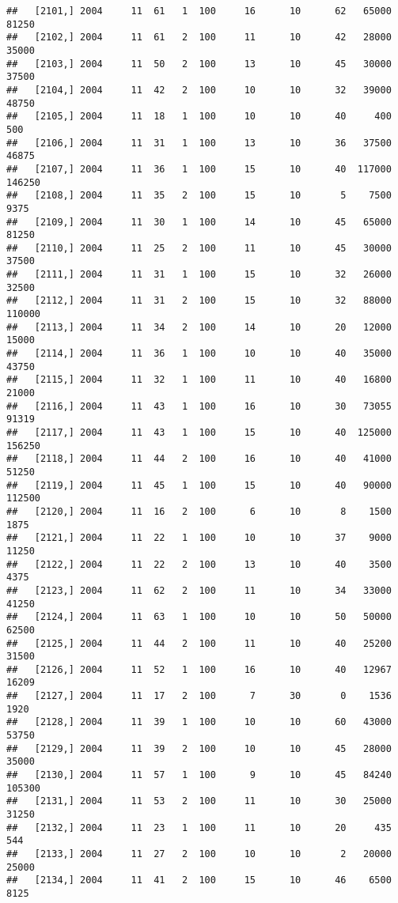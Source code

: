 \documentclass{article}\usepackage[]{graphicx}\usepackage[]{color}
\makeatletter
\newenvironment{kframe}{%
 \def\at@end@of@kframe{}%
 \ifinner\ifhmode%
  \def\at@end@of@kframe{\end{minipage}}%
  \begin{minipage}{\columnwidth}%
 \fi\fi%
 \def\FrameCommand##1{\hskip\@totalleftmargin \hskip-\fboxsep
 \colorbox{shadecolor}{##1}\hskip-\fboxsep
     \hskip-\linewidth \hskip-\@totalleftmargin \hskip\columnwidth}%
 \MakeFramed {\advance\hsize-\width
   \@totalleftmargin\z@ \linewidth\hsize
   \@setminipage}}%
 {\par\unskip\endMakeFramed%
 \at@end@of@kframe}
\newenvironment{knitrout}{}{} %
\makeatother
\begin{document}
\begin{knitrout}
\begin{kframe}
\begin{verbatim}
##   [2101,] 2004     11  61   1  100     16      10      62   65000   81250
##   [2102,] 2004     11  61   2  100     11      10      42   28000   35000
##   [2103,] 2004     11  50   2  100     13      10      45   30000   37500
##   [2104,] 2004     11  42   2  100     10      10      32   39000   48750
##   [2105,] 2004     11  18   1  100     10      10      40     400     500
##   [2106,] 2004     11  31   1  100     13      10      36   37500   46875
##   [2107,] 2004     11  36   1  100     15      10      40  117000  146250
##   [2108,] 2004     11  35   2  100     15      10       5    7500    9375
##   [2109,] 2004     11  30   1  100     14      10      45   65000   81250
##   [2110,] 2004     11  25   2  100     11      10      45   30000   37500
##   [2111,] 2004     11  31   1  100     15      10      32   26000   32500
##   [2112,] 2004     11  31   2  100     15      10      32   88000  110000
##   [2113,] 2004     11  34   2  100     14      10      20   12000   15000
##   [2114,] 2004     11  36   1  100     10      10      40   35000   43750
##   [2115,] 2004     11  32   1  100     11      10      40   16800   21000
##   [2116,] 2004     11  43   1  100     16      10      30   73055   91319
##   [2117,] 2004     11  43   1  100     15      10      40  125000  156250
##   [2118,] 2004     11  44   2  100     16      10      40   41000   51250
##   [2119,] 2004     11  45   1  100     15      10      40   90000  112500
##   [2120,] 2004     11  16   2  100      6      10       8    1500    1875
##   [2121,] 2004     11  22   1  100     10      10      37    9000   11250
##   [2122,] 2004     11  22   2  100     13      10      40    3500    4375
##   [2123,] 2004     11  62   2  100     11      10      34   33000   41250
##   [2124,] 2004     11  63   1  100     10      10      50   50000   62500
##   [2125,] 2004     11  44   2  100     11      10      40   25200   31500
##   [2126,] 2004     11  52   1  100     16      10      40   12967   16209
##   [2127,] 2004     11  17   2  100      7      30       0    1536    1920
##   [2128,] 2004     11  39   1  100     10      10      60   43000   53750
##   [2129,] 2004     11  39   2  100     10      10      45   28000   35000
##   [2130,] 2004     11  57   1  100      9      10      45   84240  105300
##   [2131,] 2004     11  53   2  100     11      10      30   25000   31250
##   [2132,] 2004     11  23   1  100     11      10      20     435     544
##   [2133,] 2004     11  27   2  100     10      10       2   20000   25000
##   [2134,] 2004     11  41   2  100     15      10      46    6500    8125

\end{verbatim}
\end{kframe}
\end{knitrout}
\end{document}
